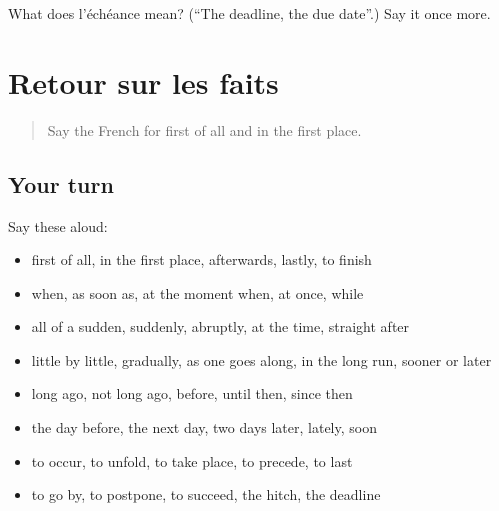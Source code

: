 \begin{tcolorbox}[breakable,colback=teal!4,colframe=teal!35!black,title={Before you move on}]
What does l'échéance mean? (\textquotedblleft{}The deadline, the due date\textquotedblright{}.) Say it once more.
\end{tcolorbox}
\section[(dialogue)]{Retour sur les faits}

\label{lesson:FR-R275-revision-268-275}



\begin{quote}
Say the French for first of all and in the first place.
\end{quote}

\subsection*{Your turn}
Say these aloud:

\begin{itemize}
\raggedright
  \item first of all, in the first place, afterwards, lastly, to finish
  \item when, as soon as, at the moment when, at once, while
  \item all of a sudden, suddenly, abruptly, at the time, straight after
  \item little by little, gradually, as one goes along, in the long run, sooner or later
  \item long ago, not long ago, before, until then, since then
  \item the day before, the next day, two days later, lately, soon
  \item to occur, to unfold, to take place, to precede, to last
  \item to go by, to postpone, to succeed, the hitch, the deadline
\end{itemize}

